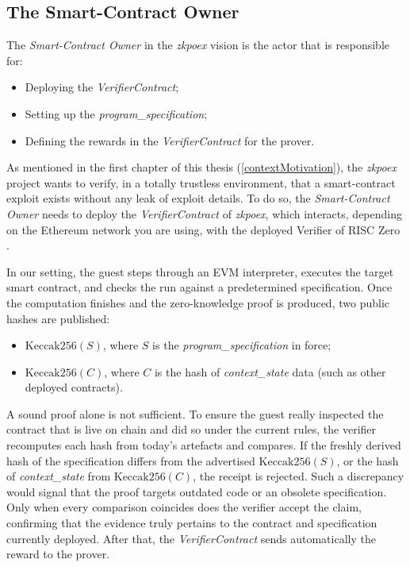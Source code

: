 \subsection{The Smart-Contract Owner}\makeatletter{}\makeatother
\label{zkpoex_scOwner}

The \textit{Smart-Contract Owner} in the \textit{zkpoex} vision is the actor that is responsible for:

\begin{itemize}
    \item Deploying the \textit{VerifierContract};
    \item Setting up the \textit{program\_specification};
    \item Defining the rewards in the \textit{VerifierContract} for the prover.
\end{itemize}

As mentioned in the first chapter of this thesis (\ref{contextMotivation}), the \textit{zkpoex} project wants to verify, in a totally trustless environment, that a smart-contract exploit exists without any leak of exploit details. To do so, the \textit{Smart-Contract Owner} needs to deploy the \textit{VerifierContract} of \textit{zkpoex}, which interacts, depending on the Ethereum network you are using, with the deployed Verifier of RISC Zero \cite{risc0_verifier}.

In our setting, the guest steps through an EVM interpreter, executes the target smart contract, and checks the run against a predetermined specification. Once the computation finishes and the zero-knowledge proof is produced, two public hashes are published: 
\begin{itemize}
    \item $\mathrm{Keccak256}(S)$, where $S$ is the \textit{program\_specification} in force;
    \item $\mathrm{Keccak256}(C)$, where $C$ is the hash of \textit{context\_state} data (such as other deployed contracts).
\end{itemize}

A sound proof alone is not sufficient. To ensure the guest really inspected the contract that is live on chain and did so under the current rules, the verifier recomputes each hash from today’s artefacts and compares. If the freshly derived hash of the specification differs from the advertised $\mathrm{Keccak256}(S)$, or the hash of \textit{context\_state} from $\mathrm{Keccak256}(C)$, the receipt is rejected. Such a discrepancy would signal that the proof targets outdated code or an obsolete specification. Only when every comparison coincides does the verifier accept the claim, confirming that the evidence truly pertains to the contract and specification currently deployed. After that, the \textit{VerifierContract} sends automatically the reward to the prover.



